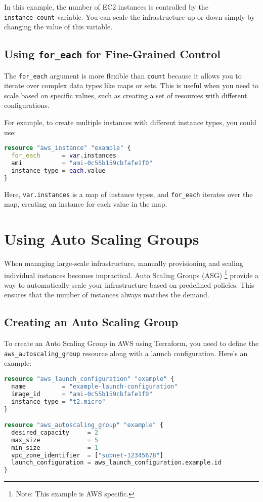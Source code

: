 In this example, the number of EC2 instances is controlled by the \texttt{instance\_count} variable. You can scale the infrastructure up or down simply by changing the value of this variable.

\subsection{Using \texttt{for\_each} for Fine-Grained Control}

The \texttt{for\_each} argument is more flexible than \texttt{count} because it allows you to iterate over complex data types like maps or sets. This is useful when you need to scale based on specific values, such as creating a set of resources with different configurations.

For example, to create multiple instances with different instance types, you could use:

\begin{lstlisting}[language=terraform]
resource "aws_instance" "example" {
  for_each      = var.instances
  ami           = "ami-0c55b159cbfafe1f0"
  instance_type = each.value
}
\end{lstlisting}

Here, \texttt{var.instances} is a map of instance types, and \texttt{for\_each} iterates over the map, creating an instance for each value in the map.

\section{Using Auto Scaling Groups}

When managing large-scale infrastructure, manually provisioning and scaling individual instances becomes impractical.
Auto Scaling Groups (ASG) \footnote{Note: This example is AWS specific.} provide a way to automatically scale your infrastructure based on predefined policies.
This ensures that the number of instances always matches the demand.



\subsection{Creating an Auto Scaling Group}

To create an Auto Scaling Group in AWS using Terraform, you need to define the \texttt{aws\_autoscaling\_group} resource along with a launch configuration. Here's an example:

\begin{lstlisting}[language=terraform]
resource "aws_launch_configuration" "example" {
  name          = "example-launch-configuration"
  image_id      = "ami-0c55b159cbfafe1f0"
  instance_type = "t2.micro"
}

resource "aws_autoscaling_group" "example" {
  desired_capacity     = 2
  max_size             = 5
  min_size             = 1
  vpc_zone_identifier  = ["subnet-12345678"]
  launch_configuration = aws_launch_configuration.example.id
}
\end{lstlisting}

